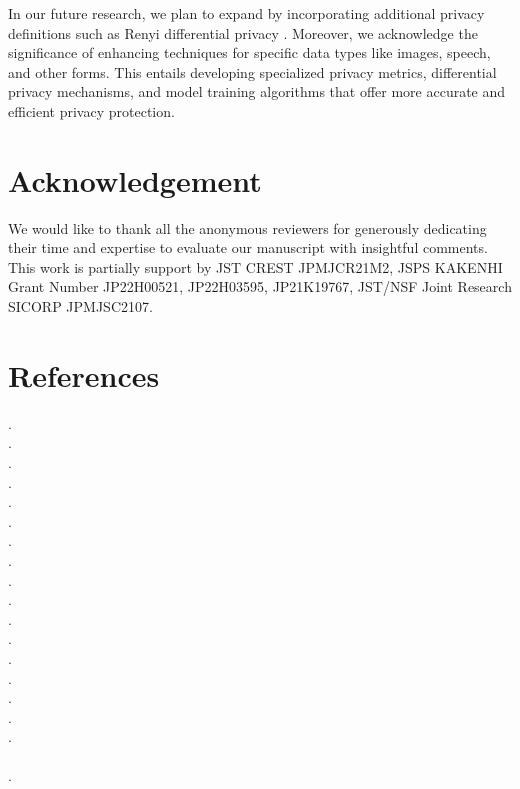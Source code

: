 \documentclass[letterpaper]{article} %
\begin{document}
In our future research, we plan to expand by incorporating additional privacy definitions such as Renyi differential privacy \cite{Girgis2021renyi}. 
Moreover, we acknowledge the significance of enhancing techniques for specific data types like images, speech, and other forms. This entails developing specialized privacy metrics, differential privacy mechanisms, and model training algorithms that offer more accurate and efficient privacy protection.

\section*{Acknowledgement}
We would like to thank all the anonymous reviewers for generously dedicating their time and expertise to evaluate our manuscript with insightful comments.
This work is partially support by JST CREST JPMJCR21M2, JSPS KAKENHI Grant Number JP22H00521, JP22H03595, JP21K19767, JST/NSF Joint Research SICORP JPMJSC2107.
\section*{References}
\label{sec:reference_examples}
\nobibliography*
{}.\\[.2em]
.\\[.2em]
.\\[.2em]
.\\[.2em]
. \\[.2em]
.\\[.2em]
.\\[.2em]
.\\[.2em]
.\\[.2em]
.\\[.2em]
. \\[.2em]
.\\[.2em]
.\\[.2em]
.\\[.2em]
.\\[.2em]
. \\[.2em]
. \\[.2em]
 \\[.2em]
. 
\end{document}
